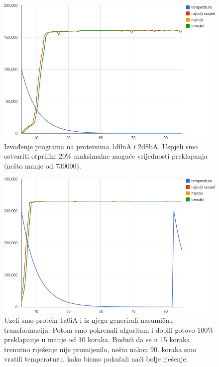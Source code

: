 \documentclass[times, utf8, zavrsni]{fer}
\begin{document}
\begin{figure}
\centering
\includegraphics[scale=0.7]{res/run_1.png}
\caption[Izvođenje programa na proteinima 1d0nA i 2d8bA]{Izvođenje programa
na proteinima 1d0nA i 2d8bA. Uspjeli smo ostvariti otprilike
20\% maksimalne moguće vrijednosti preklapanja (nešto manje od 730000). }
\label{figure:run_1}
\end{figure}

\begin{figure}
\centering
\includegraphics[scale=0.7]{res/run_2.png}
\caption[Izvođenje programa na proteinu 1a0iA i njegovoj nasumičnoj
transformaciji]{Uzeli smo protein 1a0iA i iz njega generirali
nasumičnu transformaciju. Potom smo pokrenuli algoritam i dobili gotovo
100\% preklapanje u manje od 10 koraka. Budući da se u 15 koraka
trenutno riješenje nije promijenilo, nešto nakon 90. koraka
smo vratili temperaturu, kako bismo pokušali naći bolje rješenje.}
\label{figure:run_2}
\end{figure}
\end{document}
